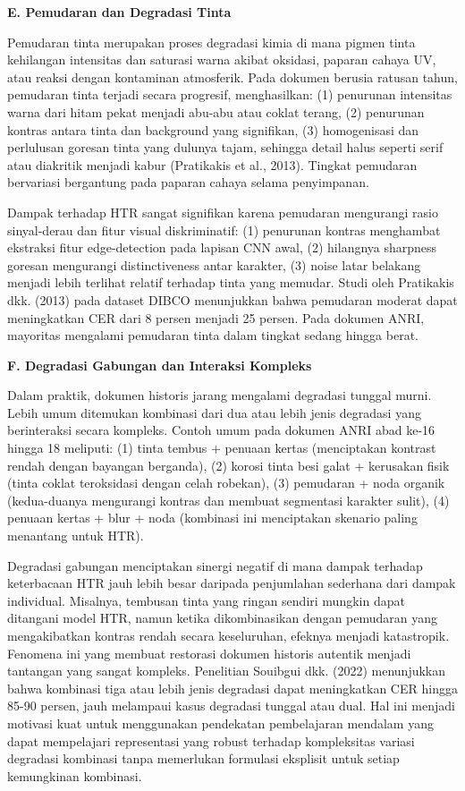 \documentclass[12pt,a4paper]{book}
\begin{document}
\vspace{0.5ex}
\noindent\textbf{E. Pemudaran dan Degradasi Tinta}

Pemudaran tinta merupakan proses degradasi kimia di mana pigmen tinta kehilangan intensitas dan saturasi warna akibat oksidasi, paparan cahaya UV, atau reaksi dengan kontaminan atmosferik. Pada dokumen berusia ratusan tahun, pemudaran tinta terjadi secara progresif, menghasilkan: (1) penurunan intensitas warna dari hitam pekat menjadi abu-abu atau coklat terang, (2) penurunan kontras antara tinta dan background yang signifikan, (3) homogenisasi dan perlulusan goresan tinta yang dulunya tajam, sehingga detail halus seperti serif atau diakritik menjadi kabur (Pratikakis et al., 2013). Tingkat pemudaran bervariasi bergantung pada paparan cahaya selama penyimpanan.

Dampak terhadap HTR sangat signifikan karena pemudaran mengurangi rasio sinyal-derau dan fitur visual diskriminatif: (1) penurunan kontras menghambat ekstraksi fitur edge-detection pada lapisan CNN awal, (2) hilangnya sharpness goresan mengurangi distinctiveness antar karakter, (3) noise latar belakang menjadi lebih terlihat relatif terhadap tinta yang memudar. Studi oleh Pratikakis dkk. (2013) pada dataset DIBCO menunjukkan bahwa pemudaran moderat dapat meningkatkan CER dari 8 persen menjadi 25 persen. Pada dokumen ANRI, mayoritas mengalami pemudaran tinta dalam tingkat sedang hingga berat.

\vspace{0.5ex}
\noindent\textbf{F. Degradasi Gabungan dan Interaksi Kompleks}

Dalam praktik, dokumen historis jarang mengalami degradasi tunggal murni. Lebih umum ditemukan kombinasi dari dua atau lebih jenis degradasi yang berinteraksi secara kompleks. Contoh umum pada dokumen ANRI abad ke-16 hingga 18 meliputi: (1) tinta tembus + penuaan kertas (menciptakan kontrast rendah dengan bayangan berganda), (2) korosi tinta besi galat + kerusakan fisik (tinta coklat teroksidasi dengan celah robekan), (3) pemudaran + noda organik (kedua-duanya mengurangi kontras dan membuat segmentasi karakter sulit), (4) penuaan kertas + blur + noda (kombinasi ini menciptakan skenario paling menantang untuk HTR).

Degradasi gabungan menciptakan sinergi negatif di mana dampak terhadap keterbacaan HTR jauh lebih besar daripada penjumlahan sederhana dari dampak individual. Misalnya, tembusan tinta yang ringan sendiri mungkin dapat ditangani model HTR, namun ketika dikombinasikan dengan pemudaran yang mengakibatkan kontras rendah secara keseluruhan, efeknya menjadi katastropik. Fenomena ini yang membuat restorasi dokumen historis autentik menjadi tantangan yang sangat kompleks. Penelitian Souibgui dkk. (2022) menunjukkan bahwa kombinasi tiga atau lebih jenis degradasi dapat meningkatkan CER hingga 85-90 persen, jauh melampaui kasus degradasi tunggal atau dual. Hal ini menjadi motivasi kuat untuk menggunakan pendekatan pembelajaran mendalam yang dapat mempelajari representasi yang robust terhadap kompleksitas variasi degradasi kombinasi tanpa memerlukan formulasi eksplisit untuk setiap kemungkinan kombinasi.
\end{document}
